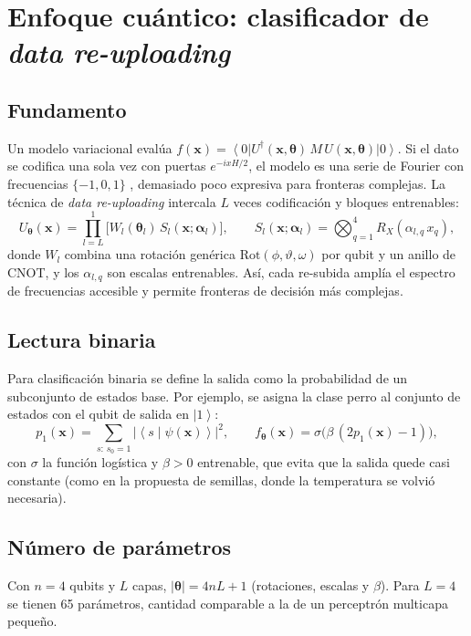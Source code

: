 \documentclass[11pt,letterpaper]{article}
\providecommand{\ket}[1]{\left|#1\right\rangle}
\providecommand{\bra}[1]{\left\langle#1\right|}
\providecommand{\braket}[2]{\left\langle#1\middle|#2\right\rangle}
\begin{document}
\section{Enfoque cuántico: clasificador de \emph{data re-uploading}}
\subsection{Fundamento}
Un modelo variacional evalúa $f(\bm{x})=\bra{0}U^\dagger(\bm{x},\bm\theta)\,M\,U(\bm{x},\bm\theta)\ket{0}$.
Si el dato se codifica una sola vez con puertas $e^{-ixH/2}$, el modelo es una serie de Fourier con
frecuencias $\{-1,0,1\}$ \cite{schuld2021}, demasiado poco expresiva para fronteras complejas. La
técnica de \emph{data re-uploading} \cite{perez2020} intercala $L$ veces codificación y bloques
entrenables:
\begin{equation}
U_{\bm\theta}(\bm{x})=\prod_{l=L}^{1}\Big[W_l(\bm\theta_l)\,S_l(\bm{x};\bm\alpha_l)\Big],\qquad
S_l(\bm{x};\bm\alpha_l)=\bigotimes_{q=1}^{4}R_X(\alpha_{l,q}\,x_q),
\end{equation}
donde $W_l$ combina una rotación genérica $\mathrm{Rot}(\phi,\vartheta,\omega)$ por qubit y un anillo
de CNOT, y los $\alpha_{l,q}$ son escalas entrenables. Así, cada re-subida amplía el espectro de
frecuencias accesible y permite fronteras de decisión más complejas.

\subsection{Lectura binaria}
Para clasificación binaria se define la salida como la probabilidad de un subconjunto de estados
base. Por ejemplo, se asigna la clase perro al conjunto de estados con el qubit de salida en $\ket{1}$:
\begin{equation}
p_1(\bm{x})=\sum_{s:\,s_0=1}\big|\braket{s}{\psi(\bm{x})}\big|^{2},\qquad
f_{\bm\theta}(\bm{x})=\sigma\big(\beta\,(2p_1(\bm{x})-1)\big),
\end{equation}
con $\sigma$ la función logística y $\beta>0$ entrenable, que evita que la salida quede casi
constante (como en la propuesta de semillas, donde la temperatura se volvió necesaria).

\subsection{Número de parámetros}
Con $n=4$ qubits y $L$ capas, $|\bm\theta|=4nL+1$ (rotaciones, escalas y $\beta$). Para $L=4$ se
tienen 65 parámetros, cantidad comparable a la de un perceptrón multicapa pequeño.
\end{document}

